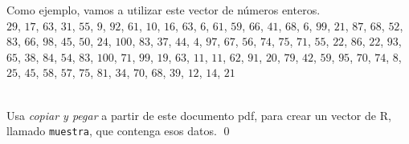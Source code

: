 \documentclass[10pt,a4paper]{article}\usepackage[]{graphicx}\usepackage[]{color}
\newcounter {cont01}
\begin{document}
Como ejemplo, vamos a utilizar este vector de números enteros.\\

$29$, $ 17$, $ 63$, $ 31$, $ 55$, $ 9$, $ 92$, $ 61$, $ 10$, $ 16$, $ 63$, $ 6$, $ 61$, $ 59$, $ 66$, $ 41$, $ 68$, $ 6$, $ 99$, $ 21$, $ 87$, $ 68$, $ 52$, $ 83$, $ 66$, $ 98$, $ 45$, $ 50$, $ 24$, $ 100$, $ 83$, $ 37$, $ 44$, $ 4$, $ 97$, $ 67$, $ 56$, $ 74$, $ 75$, $ 71$, $ 55$, $ 22$, $ 86$, $ 22$, $ 93$, $ 65$, $ 38$, $ 84$, $ 54$, $ 83$, $ 100$, $ 71$, $ 99$, $ 19$, $ 63$, $ 11$, $ 11$, $ 62$, $ 91$, $ 20$, $ 79$, $ 42$, $ 59$, $ 95$, $ 70$, $ 74$, $ 8$, $ 25$, $ 45$, $ 58$, $ 57$, $ 75$, $ 81$, $ 34$, $ 70$, $ 68$, $ 39$, $ 12$, $ 14$, $ 21$

\begin{ejercicio}
\label{tut02:ejercicio05}
\quad\\
Usa {\em copiar y pegar} a partir de este documento pdf,  para crear un vector de R, llamado {\tt muestra}, que contenga esos datos.
\qed
\end{ejercicio}
\end{document}
